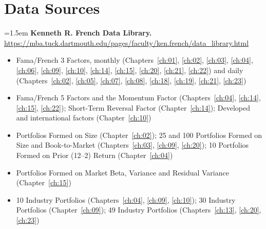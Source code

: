 \chapter*{Data Sources}
\label{datasources}


\begingroup
\footnotesize               %
\sloppy
\setlength{\parindent}{0pt}
\setlength{\parskip}{2pt}   %

\hangindent=1.5em \textbf{Kenneth R. French Data Library.} \url{https://mba.tuck.dartmouth.edu/pages/faculty/ken.french/data_library.html}
\begin{itemize}\setlength{\itemsep}{0pt}\setlength{\parskip}{0pt}
  \item Fama/French 3 Factors, monthly (Chapters~\ref{ch:01}, \ref{ch:02}, \ref{ch:03}, \ref{ch:04}, \ref{ch:06}, \ref{ch:09}, \ref{ch:10}, \ref{ch:14}, \ref{ch:15}, \ref{ch:20}, \ref{ch:21}, \ref{ch:22}) and daily (Chapters~\ref{ch:02}, \ref{ch:05}, \ref{ch:07}, \ref{ch:08}, \ref{ch:18}, \ref{ch:19}, \ref{ch:21}, \ref{ch:23})
  \item Fama/French 5 Factors and the Momentum Factor (Chapters~\ref{ch:04}, \ref{ch:14}, \ref{ch:15}, \ref{ch:22}); Short-Term Reversal Factor (Chapter~\ref{ch:14}); Developed and international factors (Chapter~\ref{ch:10})
  \item Portfolios Formed on Size (Chapter~\ref{ch:02}); 25 and 100 Portfolios Formed on Size and Book-to-Market (Chapters~\ref{ch:03}, \ref{ch:09}, \ref{ch:20}); 10 Portfolios Formed on Prior (12--2) Return (Chapter~\ref{ch:04})
  \item Portfolios Formed on Market Beta, Variance and Residual Variance (Chapter~\ref{ch:15})
  \item 10 Industry Portfolios (Chapters~\ref{ch:04}, \ref{ch:09}, \ref{ch:10}); 30 Industry Portfolios (Chapter~\ref{ch:09}); 49 Industry Portfolios (Chapters~\ref{ch:13}, \ref{ch:20}, \ref{ch:23})
\end{itemize}

